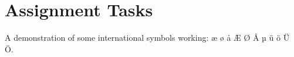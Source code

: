 \section{Assignment Tasks} 
\label{sec:Assignment Tasks}
A demonstration of some international symbols working: æ ø å Æ Ø Å µ ü ö Ü Ö.
